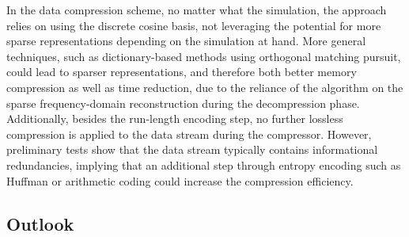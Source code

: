 In the data compression scheme, no matter what the simulation, the approach relies on using the discrete cosine basis, not leveraging the potential for more sparse representations depending
on the simulation at hand. More general techniques, such as dictionary-based methods using orthogonal matching pursuit, could lead to sparser representations, and therefore both better memory compression
as well as time reduction, due to the reliance of the algorithm on the sparse frequency-domain reconstruction during the decompression phase. Additionally, besides the run-length encoding step, no further
lossless compression is applied to the data stream during the compressor. However, preliminary tests show that the data stream typically contains informational redundancies, implying that an additional step through
entropy encoding such as Huffman or arithmetic coding could increase the compression efficiency.

\subsection{Outlook}

